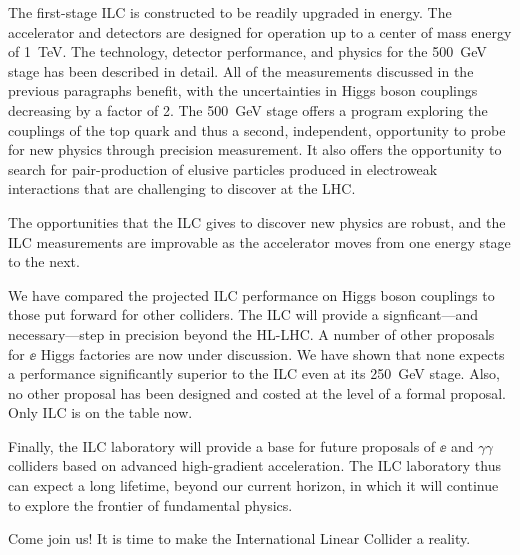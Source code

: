 The first-stage ILC is constructed to be readily upgraded in energy.
The accelerator and detectors are designed for operation up to a
center of mass energy of 1~TeV.   The technology, detector
performance, and physics for the 500~GeV stage has been described in
detail.  All of the measurements discussed in the previous paragraphs
benefit,
with the uncertainties in Higgs boson couplings decreasing by a factor
of 2.    The 500~GeV stage offers a program exploring 
the couplings of the top quark and thus a second, independent,
opportunity to probe for new physics through precision measurement.
It also offers the opportunity to search for pair-production of
elusive particles produced in electroweak interactions that are
challenging  to discover at the LHC. 

The opportunities that the ILC gives to discover new physics are
robust, and the ILC measurements are improvable as the accelerator
moves from one energy stage to the next.

We have compared the projected ILC performance on Higgs boson
couplings to those put forward for other colliders.  The ILC will
provide a signficant---and necessary---step in precision beyond the
HL-LHC.    A number of other proposals for $\ee$ Higgs factories are
now under discussion.  We have shown that none expects a performance
significantly superior to the ILC even at its 250~GeV stage.   Also,
no other proposal has been designed and costed at the level of a
formal proposal.   Only ILC is on the table now.

 Finally, the ILC laboratory will provide a base for future proposals
 of $\ee$ and $\gamma\gamma$ colliders based on advanced high-gradient
 acceleration.   The ILC laboratory thus can expect a long lifetime,
 beyond our current horizon, in which it will continue to explore the
 frontier of fundamental physics.

Come join us!   It is time to make the International Linear Collider a reality.